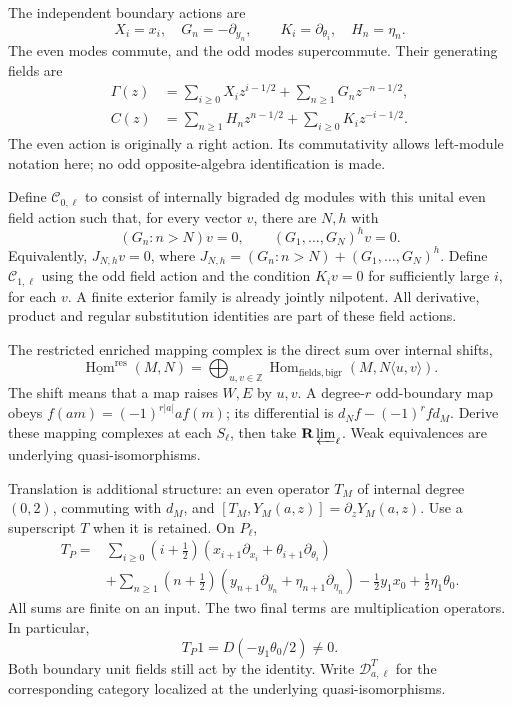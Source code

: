 The independent boundary actions are
\[
 X_i=x_i,\quad G_n=-\partial_{y_n},\qquad
 K_i=\partial_{\theta_i},\quad H_n=\eta_n.
\]
The even modes commute, and the odd modes supercommute.
Their generating fields are
\begin{align}
 \Gamma(z)&=\sum_{i\ge0}X_i z^{i-1/2}
                  +\sum_{n\ge1}G_nz^{-n-1/2},\label{eq:vol2-ramond-even}\\
 C(z)&=\sum_{n\ge1}H_nz^{n-1/2}
                  +\sum_{i\ge0}K_i z^{-i-1/2}.\label{eq:vol2-ramond-odd}
\end{align}
The even action is originally a right action. Its commutativity
allows left-module notation here; no odd opposite-algebra
identification is made.

Define \(\mathcal C_{0,\ell}\) to consist of internally
bigraded dg modules with this unital even field action such that,
for every vector \(v\), there are \(N,h\) with
\begin{equation}\label{eq:vol2-positive-mode-support}
 (G_n:n>N)v=0,\qquad (G_1,\ldots,G_N)^h v=0.
\end{equation}
Equivalently, \(J_{N,h}v=0\), where
\(J_{N,h}=(G_n:n>N)+(G_1,\ldots,G_N)^h\).
Define \(\mathcal C_{1,\ell}\) using the odd field action and
the condition \(K_iv=0\) for sufficiently large \(i\), for each
\(v\). A finite exterior family is already jointly nilpotent.
All derivative, product and regular substitution identities
are part of these field actions.

The restricted enriched mapping complex is the direct sum
over internal shifts,
\[
 \underline{\operatorname{Hom}}^{\mathrm{res}}(M,N)
 =\bigoplus_{u,v\in\mathbb Z}
   \operatorname{Hom}_{\mathrm{fields,bigr}}
                    (M,N\langle u,v\rangle).
\]
The shift means that a map raises \(W,E\) by \(u,v\).
A degree-\(r\) odd-boundary map obeys
\(f(am)=(-1)^{r|a|}af(m)\); its differential is
\(d_Nf-(-1)^rfd_M\). Derive these mapping complexes at each
\(S_\ell\), then take \(\mathbf R\varprojlim_\ell\).
Weak equivalences are underlying quasi-isomorphisms.

Translation is additional structure: an even operator \(T_M\)
of internal degree \((0,2)\), commuting with \(d_M\), and
\([T_M,Y_M(a,z)]=\partial_zY_M(a,z)\).
Use a superscript \(T\) when it is retained. On \(P_\ell\),
\begin{align}
 T_P={}&\sum_{i\ge0}(i+\tfrac12)
       (x_{i+1}\partial_{x_i}+\theta_{i+1}\partial_{\theta_i})
       \nonumber\\
 &+\sum_{n\ge1}(n+\tfrac12)
       (y_{n+1}\partial_{y_n}+\eta_{n+1}\partial_{\eta_n})
       -\tfrac12y_1x_0+\tfrac12\eta_1\theta_0.
       \label{eq:vol2-ramond-translation}
\end{align}
All sums are finite on an input. The two final terms are
multiplication operators. In particular,
\begin{equation}\label{eq:vol2-preparation-translation}
 T_P1=D(-y_1\theta_0/2)\ne0.
\end{equation}
Both boundary unit fields still act by the identity.
Write \(\mathcal D^T_{a,\ell}\) for the corresponding
category localized at the underlying quasi-isomorphisms.

